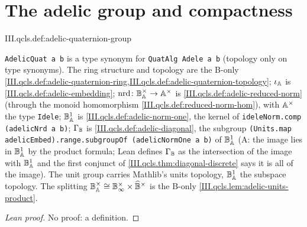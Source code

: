 \section{The adelic group and compactness}\label{sec:qcls-compact}

\begin{definition}
\end{definition}
\begin{tfformal}{III.qcls.def:adelic-quaternion-group}
\begin{tffidelity}
\texttt{AdelicQuat a b} is a type synonym for \texttt{QuatAlg Adele a b} (topology only on type synonyms). The ring structure and topology are the B-only \cref{III.qcls.def:adelic-quaternion-ring,III.qcls.def:adelic-quaternion-topology}; $\iota_{\mathbb{A}}$ is \cref{III.qcls.def:adelic-embedding}; $\operatorname{nrd}\colon\mathbb{B}_{\mathbb{A}}^\times\to\mathbb{A}^\times$ is \cref{III.qcls.def:adelic-reduced-norm} (through the monoid homomorphism \cref{III.qcls.def:reduced-norm-hom}), with $\mathbb{A}^\times$ the type \texttt{Idele}; $\mathbb{B}_{\mathbb{A}}^1$ is \cref{III.qcls.def:adelic-norm-one}, the kernel of \texttt{ideleNorm.comp (adelicNrd a b)}; $\Gamma_{\mathbb{B}}$ is \cref{III.qcls.def:adelic-diagonal}, the subgroup \texttt{(Units.map adelicEmbed).range.subgroupOf (adelicNormOne a b)} of $\mathbb{B}_{\mathbb{A}}^1$ (A: the image lies in $\mathbb{B}_{\mathbb{A}}^1$ by the product formula; Lean defines $\Gamma_{\mathbb{B}}$ as the intersection of the image with $\mathbb{B}_{\mathbb{A}}^1$ and the first conjunct of \cref{III.qcls.thm:diagonal-discrete} says it is all of the image). The unit group carries Mathlib's units topology, $\mathbb{B}_{\mathbb{A}}^1$ the subspace topology. The splitting $\mathbb{B}_{\mathbb{A}}^\times\cong\mathbb{B}_{\infty}^\times\times\widehat{\mathbb{B}}^\times$ is the B-only \cref{III.qcls.lem:adelic-units-product}.
\end{tffidelity}
\end{tfformal}
\begin{proof}[Lean proof]
No proof: a definition.
\end{proof}

